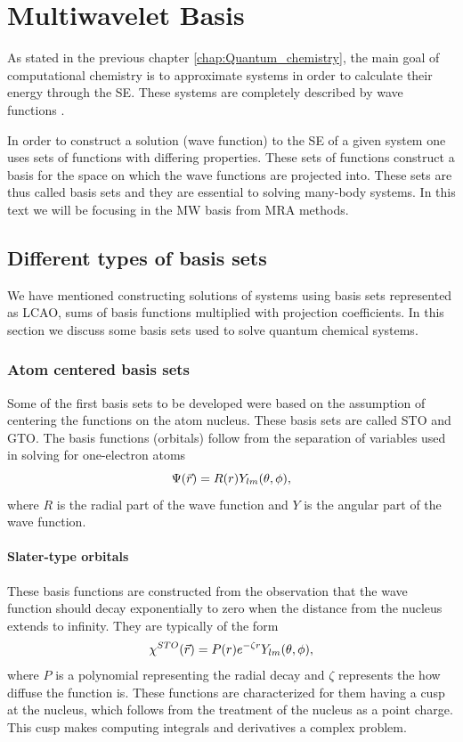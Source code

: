 \documentclass[../Thesis.tex]{subfiles}
\begin{document}
\chapter{Multiwavelet Basis}\label{chap:MW_basis}
As stated in the previous chapter \ref{chap:Quantum_chemistry}, the main goal of computational chemistry is
to approximate systems in order to calculate their energy through the \ac{SE}. %
These systems are completely described by wave functions \cite{Cohen:1973}.


In order to construct a solution (wave function) to the \ac{SE} of a given
system one uses sets of functions with differing properties. These
sets of functions construct a basis for the space on which the wave functions
are projected into. These sets are thus called basis sets \cite{Cramer:2004}
and they are essential to solving many-body systems. In this text we will be
focusing in the \ac{MW} basis from \ac{MRA} methods.

\section{Different types of basis sets}
We have mentioned constructing solutions of systems using basis sets represented as
\ac{LCAO}, sums of basis functions multiplied with projection coefficients.
In this section we discuss some basis sets used to solve quantum chemical systems.

\subsection{Atom centered basis sets}
Some of the first basis sets to be developed were based on the assumption of
centering the functions on the atom nucleus. These basis sets are called \ac{STO}
and \ac{GTO}. The basis functions (orbitals) follow from the separation of variables
used in solving for one-electron atoms
\begin{equation}
  \Psi(\vec{r}) = R(r)Y_{lm}(\theta, \phi),
\end{equation}
where $R$ is the radial part of the wave function and $Y$ is the angular part of
the wave function.

\subsubsection{Slater-type orbitals}
These basis functions are constructed from the observation that the wave function
should decay exponentially to zero when the distance from the nucleus extends
to infinity. They are typically of the form \cite{Jensen:2017, ESQCB1P1}
\begin{equation}
  \chi^{STO}(\vec{r}) = P(r)e^{-\zeta r}Y_{lm}(\theta, \phi),
\end{equation}
where $P$ is a polynomial representing the radial decay and $\zeta$ represents the
how diffuse the function is. These functions are characterized for them having a cusp
at the nucleus, which follows from the treatment of the nucleus as a point charge.
This cusp makes computing integrals and derivatives a complex problem.
\end{document}
